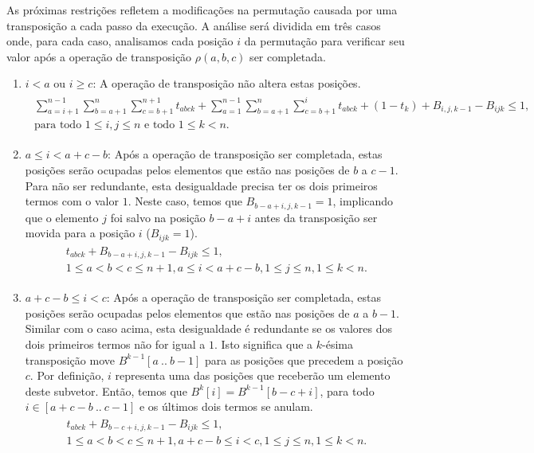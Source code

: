 As próximas restrições refletem a modificações na permutação causada
por uma transposição a cada passo da execução. A análise será dividida em
três casos onde, para cada caso, analisamos cada posição $i$ da
permutação para verificar seu valor após a operação de transposição
$\rho(a,b,c)$ ser completada.
\begin{enumerate}
\item{$i < a$ ou $i \ge c$:
A operação de transposição não altera estas posições.
\begin{align}
  \begin{split} 
    \sum_{a=i+1}^{n-1}\sum_{b=a+1}^{n}\sum_{c=b+1}^{n+1} t_{abck}
    + \sum_{a=1}^{n-1}\sum_{b=a+1}^{n}\sum_{c=b+1}^{i} t_{abck} + (1 -
    t_{k}) + B_{i,j,k-1} - B_{ijk} \le 1, \\
    \text{para todo $1 \le i, j \le n$ e todo $1 \le k <
    n$}.
  \end{split} \label{eq:transp3}
\end{align}}
\item{$a \le i < a + c -b$:
Após a operação de transposição ser completada, estas posições serão
ocupadas pelos elementos que estão nas posições de $b$ a $c - 1$. Para
não ser redundante, esta desigualdade precisa ter os dois primeiros
termos com o valor $1$. Neste caso, temos que $B_{b-a+i,j,k-1} = 1$,
implicando que o elemento $j$ foi salvo na posição $b - a + i$ antes
da transposição ser movida para a posição $i$ ($B_{ijk} = 1$).
\begin{align}
  \begin{split}
  t_{abck} + B_{b-a+i,j,k-1} - B_{ijk} \le 1, \\
  \text{$1 \le a < b < c \le n + 1, a \le i < a + c -b, 1 \le j
  \le n, 1 \le k < n$}.
  \end{split}
  \label{eq:transp4}
\end{align}}
\item{$a + c - b \le i < c$:
Após a operação de transposição ser completada, estas posições serão
ocupadas pelos elementos que estão nas posições de $a$ a $b -
1$. Similar com o caso acima, esta desigualdade é redundante se os
valores dos dois primeiros termos não for igual a $1$. Isto significa
que a $k$-ésima transposição move $B^{k-1}[a~..~b-1]$ para as posições
que precedem a posição $c$. Por definição, $i$ representa uma das
posições que receberão um elemento deste subvetor. Então, temos que
$B^{k}[i] = B^{k-1}[b - c + i]$, para todo $i \in [a + c - b~..~c -
1]$ e os últimos dois termos se anulam.
\begin{align}
  \begin{split}
  t_{abck} + B_{b-c+i,j,k-1} - B_{ijk} \le 1, \\
  \text{$1 \le a < b < c \le n + 1, a + c - b \le i < c, 1 \le j
  \le n, 1 \le k < n$}.  
  \end{split}
  \label{eq:transp5}
\end{align}}
\end{enumerate}

